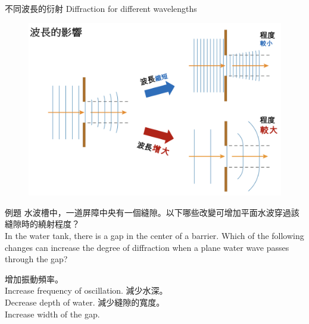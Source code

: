 \documentclass[beamer=true]{standalone}
\begin{document}
\begin{frame}{不同波長的衍射 Diffraction for different wavelengths}
    \begin{figure}
        \centering
        \includegraphics[width=0.95\linewidth]{images/Screenshot 2023-09-27 at 9.50.14 PM.png}


    \end{figure}
\end{frame}
\begin{frame}{例題}
    水波槽中，一道屏障中央有一個縫隙。以下哪些改變可增加平面水波穿過該縫隙時的繞射程度？\\In the water tank, there is a gap in the center of a barrier. Which of the following changes can increase the degree of diffraction when a plane water wave passes through the gap?

    \begin{statements}
        \task 增加振動頻率。\\Increase frequency of oscillation.
        \task 減少水深。\\Decrease depth of water.
        \task 減少縫隙的寬度。\\Increase width of the gap.
    \end{statements}


\end{frame}
\end{document}
